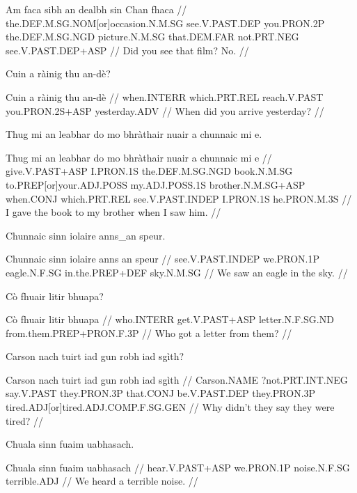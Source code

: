 \documentclass[a4paper,10pt]{article}
\begin{document}
\vspace{4mm}
\gla Am faca sibh an dealbh sin Chan fhaca  //
\glb the.DEF.M.SG.NOM[or]occasion.N.M.SG see.V.PAST.DEP you.PRON.2P the.DEF.M.SG.NGD picture.N.M.SG that.DEM.FAR not.PRT.NEG see.V.PAST.DEP+ASP  //
\glft Did you see that film? No. //
\endgl
\xe

\ex
\begingl
\glpre Cuin a ràinig thu an-dè? 

\vspace{4mm}
\gla Cuin a ràinig thu an-dè  //
\glb when.INTERR which.PRT.REL reach.V.PAST you.PRON.2S+ASP yesterday.ADV  //
\glft When did you arrive yesterday? //
\endgl
\xe

\ex
\begingl
\glpre Thug mi an leabhar do mo bhràthair nuair a chunnaic mi e. 

\vspace{4mm}
\gla Thug mi an leabhar do mo bhràthair nuair a chunnaic mi e  //
\glb give.V.PAST+ASP I.PRON.1S the.DEF.M.SG.NGD book.N.M.SG to.PREP[or]your.ADJ.POSS my.ADJ.POSS.1S brother.N.M.SG+ASP when.CONJ which.PRT.REL see.V.PAST.INDEP I.PRON.1S he.PRON.M.3S  //
\glft I gave the book to my brother when I saw him. //
\endgl
\xe

\ex
\begingl
\glpre Chunnaic sinn iolaire anns\_an speur. 

\vspace{4mm}
\gla Chunnaic sinn iolaire {anns an} speur  //
\glb see.V.PAST.INDEP we.PRON.1P eagle.N.F.SG in.the.PREP+DEF sky.N.M.SG  //
\glft We saw an eagle in the sky. //
\endgl
\xe

\ex
\begingl
\glpre Cò fhuair litir bhuapa? 

\vspace{4mm}
\gla Cò fhuair litir bhuapa  //
\glb who.INTERR get.V.PAST+ASP letter.N.F.SG.ND from.them.PREP+PRON.F.3P  //
\glft Who got a letter from them? //
\endgl
\xe

\ex
\begingl
\glpre Carson nach tuirt iad gun robh iad sgìth? 

\vspace{4mm}
\gla Carson nach tuirt iad gun robh iad sgìth  //
\glb Carson.NAME ?not.PRT.INT.NEG say.V.PAST they.PRON.3P that.CONJ be.V.PAST.DEP they.PRON.3P tired.ADJ[or]tired.ADJ.COMP.F.SG.GEN  //
\glft Why didn't they say they were tired? //
\endgl
\xe

\ex
\begingl
\glpre Chuala sinn fuaim uabhasach. 

\vspace{4mm}
\gla Chuala sinn fuaim uabhasach  //
\glb hear.V.PAST+ASP we.PRON.1P noise.N.F.SG terrible.ADJ  //
\glft We heard a terrible noise. //
\endgl
\xe
\end{document}
